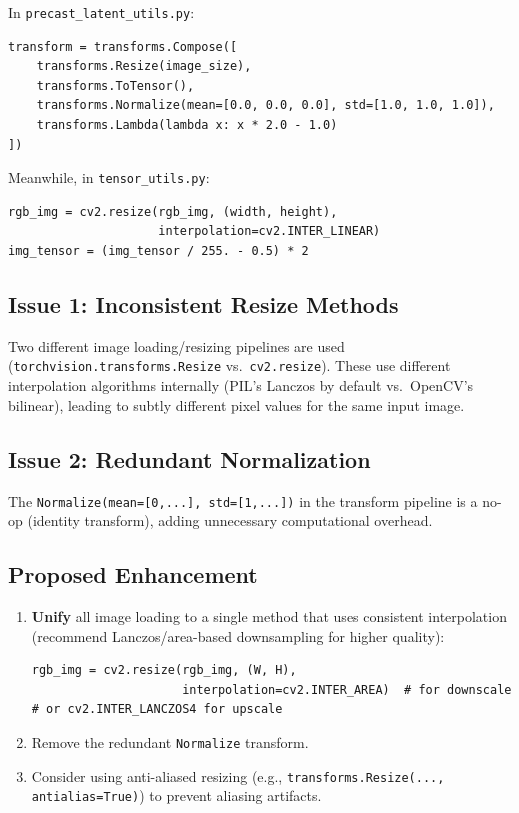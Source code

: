 \documentclass[11pt,a4paper]{article}
\newcommand{\file}[1]{\texttt{#1}}
\newcommand{\fn}[1]{\texttt{#1}}
\begin{document}
In \file{precast\_latent\_utils.py}:
\begin{lstlisting}
transform = transforms.Compose([
    transforms.Resize(image_size),
    transforms.ToTensor(),
    transforms.Normalize(mean=[0.0, 0.0, 0.0], std=[1.0, 1.0, 1.0]),
    transforms.Lambda(lambda x: x * 2.0 - 1.0)
])
\end{lstlisting}

Meanwhile, in \file{tensor\_utils.py}:
\begin{lstlisting}
rgb_img = cv2.resize(rgb_img, (width, height),
                     interpolation=cv2.INTER_LINEAR)
img_tensor = (img_tensor / 255. - 0.5) * 2
\end{lstlisting}

\subsection{Issue 1: Inconsistent Resize Methods}

Two different image loading/resizing pipelines are used (\fn{torchvision.transforms.Resize} vs.\ \fn{cv2.resize}).
These use different interpolation algorithms internally (PIL's Lanczos by default vs.\ OpenCV's bilinear), leading to subtly different pixel values for the same input image.

\subsection{Issue 2: Redundant Normalization}

The \fn{Normalize(mean=[0,...], std=[1,...])} in the transform pipeline is a no-op (identity transform), adding unnecessary computational overhead.

\subsection{Proposed Enhancement}

\begin{enumerate}
    \item \textbf{Unify} all image loading to a single method that uses consistent interpolation (recommend Lanczos/area-based downsampling for higher quality):
\begin{lstlisting}
rgb_img = cv2.resize(rgb_img, (W, H),
                     interpolation=cv2.INTER_AREA)  # for downscale
# or cv2.INTER_LANCZOS4 for upscale
\end{lstlisting}

    \item Remove the redundant \fn{Normalize} transform.
    \item Consider using anti-aliased resizing (e.g., \fn{transforms.Resize(..., antialias=True)}) to prevent aliasing artifacts.
\end{enumerate}
\end{document}
